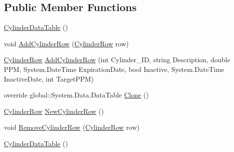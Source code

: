 \subsection*{Public Member Functions}
\begin{DoxyCompactItemize}
\item 
\hyperlink{class_env_int_1_1_win32_1_1_field_tech_1_1_manager_1_1_data_sets_1_1_guide_ware_mobile_data_set_1_1_cylinder_data_table_a276727c5678c3c1e9b6ed0202e573076}{Cylinder\+Data\+Table} ()
\item 
void \hyperlink{class_env_int_1_1_win32_1_1_field_tech_1_1_manager_1_1_data_sets_1_1_guide_ware_mobile_data_set_1_1_cylinder_data_table_af45d27e41736a04745960928e36033ed}{Add\+Cylinder\+Row} (\hyperlink{class_env_int_1_1_win32_1_1_field_tech_1_1_manager_1_1_data_sets_1_1_guide_ware_mobile_data_set_1_1_cylinder_row}{Cylinder\+Row} row)
\item 
\hyperlink{class_env_int_1_1_win32_1_1_field_tech_1_1_manager_1_1_data_sets_1_1_guide_ware_mobile_data_set_1_1_cylinder_row}{Cylinder\+Row} \hyperlink{class_env_int_1_1_win32_1_1_field_tech_1_1_manager_1_1_data_sets_1_1_guide_ware_mobile_data_set_1_1_cylinder_data_table_aaec1ad7d2eb796c3c432c67cb15d6db7}{Add\+Cylinder\+Row} (int Cylinder\+\_\+\+I\+D, string Description, double P\+P\+M, System.\+Date\+Time Expiration\+Date, bool Inactive, System.\+Date\+Time Inactive\+Date, int Target\+P\+P\+M)
\item 
override global\+::\+System.\+Data.\+Data\+Table \hyperlink{class_env_int_1_1_win32_1_1_field_tech_1_1_manager_1_1_data_sets_1_1_guide_ware_mobile_data_set_1_1_cylinder_data_table_acc28d7467e204bb522f9e37fc3654dd5}{Clone} ()
\item 
\hyperlink{class_env_int_1_1_win32_1_1_field_tech_1_1_manager_1_1_data_sets_1_1_guide_ware_mobile_data_set_1_1_cylinder_row}{Cylinder\+Row} \hyperlink{class_env_int_1_1_win32_1_1_field_tech_1_1_manager_1_1_data_sets_1_1_guide_ware_mobile_data_set_1_1_cylinder_data_table_aa16fd02d3df499f1b8f444e0e36027bf}{New\+Cylinder\+Row} ()
\item 
void \hyperlink{class_env_int_1_1_win32_1_1_field_tech_1_1_manager_1_1_data_sets_1_1_guide_ware_mobile_data_set_1_1_cylinder_data_table_add4d002cb111289ab667a4ee14ffeea2}{Remove\+Cylinder\+Row} (\hyperlink{class_env_int_1_1_win32_1_1_field_tech_1_1_manager_1_1_data_sets_1_1_guide_ware_mobile_data_set_1_1_cylinder_row}{Cylinder\+Row} row)
\item 
\hyperlink{class_env_int_1_1_win32_1_1_field_tech_1_1_manager_1_1_data_sets_1_1_guide_ware_mobile_data_set_1_1_cylinder_data_table_a276727c5678c3c1e9b6ed0202e573076}{Cylinder\+Data\+Table} ()

\end{DoxyCompactItemize}
